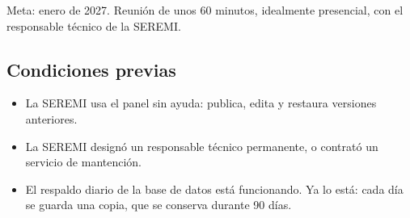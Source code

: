 \documentclass[11pt,letterpaper]{article}
\begin{document}
{\color{h2vgris}Meta: enero de 2027. Reunión de unos 60 minutos, idealmente presencial, con el responsable técnico de la SEREMI.}

\subsection*{Condiciones previas}
\begin{itemize}
\item La SEREMI usa el panel sin ayuda: publica, edita y restaura versiones anteriores.
\item La SEREMI designó un responsable técnico permanente, o contrató un servicio de mantención.
\item El respaldo diario de la base de datos está funcionando. Ya lo está: cada día se guarda una copia, que se conserva durante 90 días.
\end{itemize}
\end{document}
